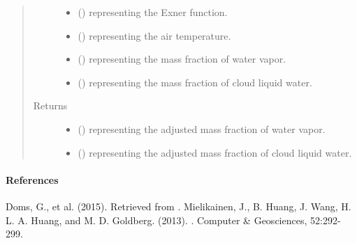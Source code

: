 \documentclass[letterpaper,10pt,english]{sphinxmanual}
\begin{document}
\begin{fulllineitems}
\begin{fulllineitems}
\begin{quote}
\begin{description}
\begin{itemize}
\item {} 
 () \textendash{}  representing the Exner function.

\item {} 
 () \textendash{}  representing the air temperature.

\item {} 
 () \textendash{}  representing the mass fraction of water vapor.

\item {} 
 () \textendash{}  representing the mass fraction of cloud liquid water.

\end{itemize}

\item[{Returns}] \leavevmode
\begin{itemize}
\item {} 
 () \textendash{}  representing the adjusted mass fraction of water vapor.

\item {} 
 () \textendash{}  representing the adjusted mass fraction of cloud liquid water.

\end{itemize}


\end{description}\end{quote}
\paragraph{References}

Doms, G., et al. (2015).  Retrieved from .              Mielikainen, J., B. Huang, J. Wang, H. L. A. Huang, and M. D. Goldberg. (2013).                         . Computer \& Geosciences, 52:292-299.


\end{fulllineitems}
\end{fulllineitems}
\end{document}
